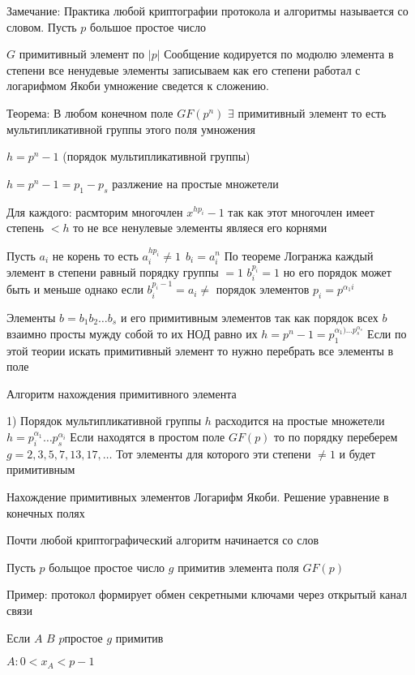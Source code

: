 Замечание: Практика любой криптографии протокола и алгоритмы называется со
словом. Пусть $p$ большое простое число

$G$ примитивный элемент по $|p|$ Сообщение кодируется по модюлю элемента в
степени все ненудевые элементы записываем как его степени работал с логарифмом
Якоби умножение сведется к сложению.

Теорема: В любом конечном поле $GF(p^n)$ $\exists$ примитивный элемент то есть
мультипликативной группы этого поля умножения

$h = p^n -1$ (порядок мультипликативной группы)

$h = p^n -1 = p_1 - p_s$ разлжение на простые множетели

Для каждого: расмторим многочлен $x^{hp_i}-1$ так как этот многочлен имеет
степень $<h$ то не все ненулевые элементы являеся его корнями

Пусть $a_i$ не корень то есть $a_i^{hp_i} \not= 1 ~~ b_i = a_i^{n}$ По
теореме Логранжа каждый элемент в степени равный порядку группы $=1$
$b_i^{p_i} =1$ но его порядок может быть и меньше однако если
$b_i^{p_i-1} = a_i \not=$ порядок элементов $p_i = p^{\alpha_1 i}$

Элементы $b=b_1b_2\ldots b_s$ и его примитивным элементов так как порядок всех
$b$ взаимно просты мужду собой то их НОД равно их $h = p^n-1 = p_1^{\alpha_1)
\ldots p_s^{\alpha_s}}$ Если по этой теории искать примитивный элемент то нужно
перебрать все элементы в поле

Алгоритм нахождения примитивного элемента

1) Порядок мультипликативной группы $h$ расходится на простые множетели
$h = p_i^{\alpha_1} \ldots p_s^{\alpha_i}$ Если находятся в простом поле
$GF(p)$ то по порядку переберем $g =2,3,5,7,13,17, \ldots$ Тот элементы для
которого эти степени $\not =1$ и будет примитивным

\begin{title}[\large]
  Нахождение примитивных элементов Логарифм Якоби. Решение уравнение в конечных
  полях
\end{title}

Почти любой криптографический алгоритм начинается со слов

Пусть $p$ больщое простое число $g$ примитив элемента поля $GF(p)$

Пример: протокол формирует обмен секретными ключами через открытый канал связи

Если $A$ $B$ $p$простое $g$ примитив

$A: 0 < x_A < p-1$

